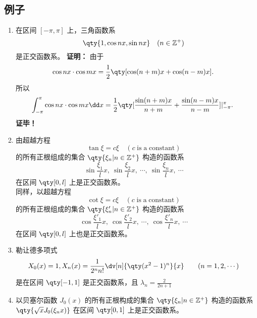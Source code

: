 \subsection{例子}
\begin{enumerate}
\item 在区间 $[-\pi,\pi]$ 上，三角函数系
\begin{equation}
\qty{1,\cos nx,\sin nx}\quad(n\in \mathbb{Z^{+}})~
\end{equation}
是正交函数系。
\textbf{证明：}
由于
\begin{equation}
\cos nx\cdot\cos mx=\frac{1}{2}\qty[\cos(n+m)x+\cos(n-m)x].~
\end{equation}
所以
\begin{equation}
\int_{-\pi}^\pi\cos nx \cdot \cos mx\dd x=\frac{1}{2}\qty[\frac{\sin(n+m)x}{n+m}+\frac{\sin(n-m)x}{n-m}]\huge|_{-\pi}^{\pi}.
~
\end{equation}
\textbf{证毕！}
\item 由超越方程
\begin{equation}
\tan\xi=c\xi \quad(c\; \mathrm{is\; a\; constant})~
\end{equation}
 的所有正根组成的集合 $\qty{\xi_n\vert n\in\mathbb{Z}^+}$
 构造的函数系
 \begin{equation}
 \sin\frac{\xi_1}{l}x,\ \sin\frac{\xi_2}{l}x,\ \cdots,\ \sin\frac{\xi_n}{l}x,\ \cdots~
 \end{equation}
 在区间 $\qty[0,l]$ 上是正交函数系。\\
 
 同样，以超越方程
\begin{equation}
\cot\xi=c\xi \quad(c\; \mathrm{is\; a\; constant})~
\end{equation}
 的所有正根组成的集合 $\qty{\xi'_n\vert n\in\mathbb{Z}^+}$
 构造的函数系
 \begin{equation}
 \cos\frac{\xi'_1}{l}x,\ \cos\frac{\xi'_2}{l}x,\ \cdots,\ \cos\frac{\xi'_n}{l}x,\ \cdots~
 \end{equation}
 在区间 $\qty[0,l]$ 上也是正交函数系。
 \item 勒让德多项式
\begin{equation}
X_0(x)=1,X_n(x)=\frac{1}{2^nn!}\dv[n]{\qty(x^2-1)^n}{x}\qquad(n=1,2,\cdots)~
\end{equation}
是在区间 $\qty[-1,1]$ 是正交函数系，且 $\lambda_n=\frac{2}{2n+1}$
\item 以贝塞尔函数 $J_0(x)$ 的所有正根构成的集合 $\qty{\xi_n\vert n\in\mathbb{Z}^+}$
构造的函数系 $\qty{\sqrt{x}J_0(\xi_n x)} $ 在区间 $\qty[0,1]$ 上是正交函数系。
\end{enumerate}

